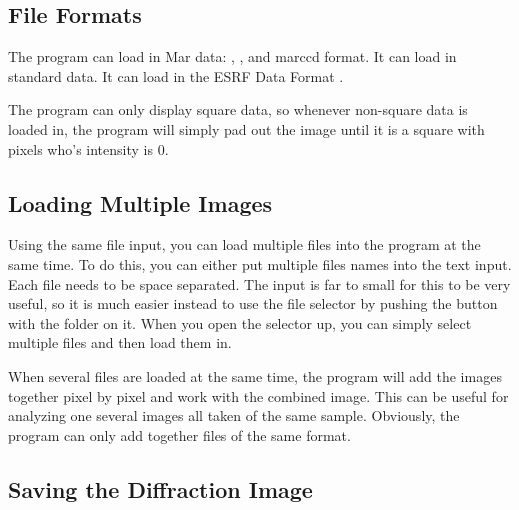 \subsection{File Formats}

The program can load in Mar data: , 
, and  marccd format.
It can load in standard  data. 
It can load in the ESRF Data Format 
.

The program can only display square data, so whenever non-square
data is loaded in, the program will simply pad out the image until
it is a square with pixels who's intensity is 0. 


\subsection{Loading Multiple Images}

Using the same file input, you can load multiple files into 
the program at the same time. To do this, you can either put multiple
files names into the  text input. Each file needs to
be space separated. The input is far to small for this to be very useful,
so it is much easier instead to use the file selector by pushing the
button with the folder on it. When you open the selector up, you can 
simply select multiple files and then load them in.

When several files are loaded at the same time, the program will add
the images together pixel by pixel and work with the combined image.
This can be useful for analyzing one several images all taken of the
same sample. Obviously, the program can only add together files of
the same format.

\subsection{Saving the Diffraction Image}


